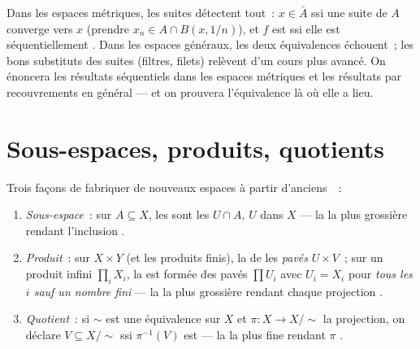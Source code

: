 \begin{remark}\label{rem:b3:topology:sequences}
Dans les espaces métriques, les suites détectent tout~: $x \in
\bar A$ ssi une suite de $A$ converge vers $x$ (prendre $x_n
\in A \cap B(x, 1/n)$), et $f$ est  ssi elle est
séquentiellement . Dans les espaces généraux, les deux
équivalences échouent~; les bons substituts des suites
(filtres, filets) relèvent d'un cours plus avancé. On énoncera
les résultats séquentiels dans les espaces métriques et les
résultats par recouvrements en général --- et on prouvera
l'équivalence là où elle a lieu.
\end{remark}

\section{Sous-espaces, produits, quotients}

\begin{definition}\label{def:b3:topology:constructions}
Trois façons de fabriquer de nouveaux espaces à partir
d'anciens~~:
\begin{enumerate}
  \item \emph{Sous-espace}~: sur $A \subseteq X$, les 
        sont les $U \cap A$, $U$  dans $X$ --- la 
        la plus grossière rendant l'inclusion .
  \item \emph{Produit}~: sur $X \times Y$ (et les produits
        finis), la  de  les \emph{pavés }
        $U \times V$~; sur un produit infini $\prod_i X_i$, la
         est formée des pavés $\prod U_i$ avec $U_i = X_i$
        pour \emph{tous les $i$ sauf un nombre fini} --- la
         la plus grossière rendant chaque projection
        .
  \item \emph{Quotient}~: si $\sim$ est une équivalence sur $X$
        et $\pi\colon X \to X/{\sim}$ la projection, on déclare
        $V \subseteq X/{\sim}$  ssi $\pi^{-1}(V)$ est
         --- la  la plus fine rendant $\pi$
        .
\end{enumerate}
\end{definition}


